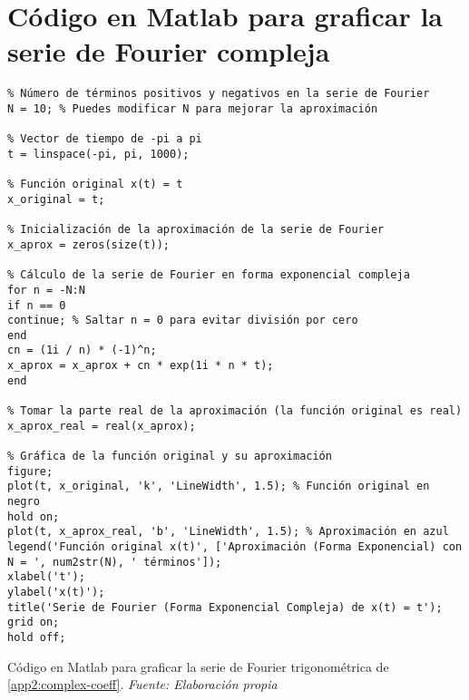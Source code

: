 \section{Código en Matlab para graficar la serie de Fourier compleja}\label{app3:complex-code-matlab}
\begin{longlisting}
	\begin{verbatim}
% Número de términos positivos y negativos en la serie de Fourier
N = 10; % Puedes modificar N para mejorar la aproximación

% Vector de tiempo de -pi a pi
t = linspace(-pi, pi, 1000);

% Función original x(t) = t
x_original = t;

% Inicialización de la aproximación de la serie de Fourier
x_aprox = zeros(size(t));

% Cálculo de la serie de Fourier en forma exponencial compleja
for n = -N:N
if n == 0
continue; % Saltar n = 0 para evitar división por cero
end
cn = (1i / n) * (-1)^n;
x_aprox = x_aprox + cn * exp(1i * n * t);
end

% Tomar la parte real de la aproximación (la función original es real)
x_aprox_real = real(x_aprox);

% Gráfica de la función original y su aproximación
figure;
plot(t, x_original, 'k', 'LineWidth', 1.5); % Función original en negro
hold on;
plot(t, x_aprox_real, 'b', 'LineWidth', 1.5); % Aproximación en azul
legend('Función original x(t)', ['Aproximación (Forma Exponencial) con N = ', num2str(N), ' términos']);
xlabel('t');
ylabel('x(t)');
title('Serie de Fourier (Forma Exponencial Compleja) de x(t) = t');
grid on;
hold off;	
	\end{verbatim}
	\caption[Código en Matlab para graficar la serie de Fourier compleja de \ref{app2:complex-coeff}.] {Código en Matlab para graficar la serie de Fourier trigonométrica de \ref{app2:complex-coeff}. \textit{Fuente: Elaboración propia}} 
\end{longlisting}

